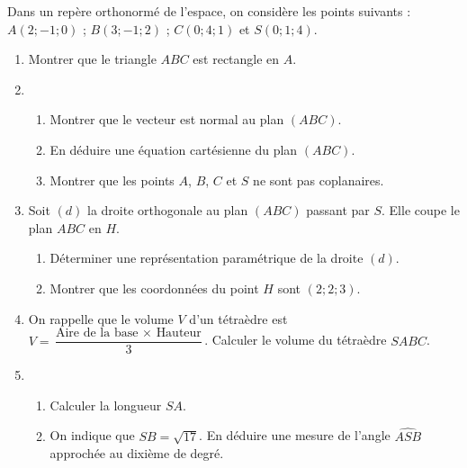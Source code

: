 \documentclass[11pt,fleqn, openany]{book} %
\begin{document}
\begin{exercise}[subtitle={(Centres étrangers 2021)}]

Dans un repère orthonormé de l'espace, on considère les points suivants : $A(2 ; -1 ; 0)$ ; $B(3 ; -1 ; 2)$ ; $C(0 ; 4 ; 1)$ et $S(0 ; 1 ; 4)$.

\begin{enumerate}
\item Montrer que le triangle $ABC$ est rectangle en $A$.
\item 
\begin{enumerate}
\item  Montrer que le vecteur   est normal au plan $(ABC)$.
\item En déduire une équation cartésienne du plan $(ABC)$.
\item Montrer que les points $A$, $B$, $C$ et $S$ ne sont pas coplanaires.
\end{enumerate}
\vskip5pt
\item Soit $(d)$ la droite orthogonale au plan $(ABC)$ passant par $S$. Elle coupe le plan $ABC$ en $H$.
\begin{enumerate}
\item Déterminer une représentation paramétrique de la droite $(d)$.
\item  Montrer que les coordonnées du point $H$ sont $(2;2;3)$.
\end{enumerate}
\vskip5pt
\item On rappelle que le volume $V$ d'un tétraèdre est $ V = \dfrac{\text{Aire de la base } \times \text{ Hauteur}}{3}$. Calculer le volume du tétraèdre $SABC$.
\vskip5pt
\item \begin{enumerate}
\item Calculer la longueur $SA$.
\item On indique que $SB=\sqrt{17}$. En déduire une mesure de l'angle $\widehat{ASB}$ approchée au dixième de degré.
\end{enumerate}\end{enumerate}
\end{exercise}
\end{document}
